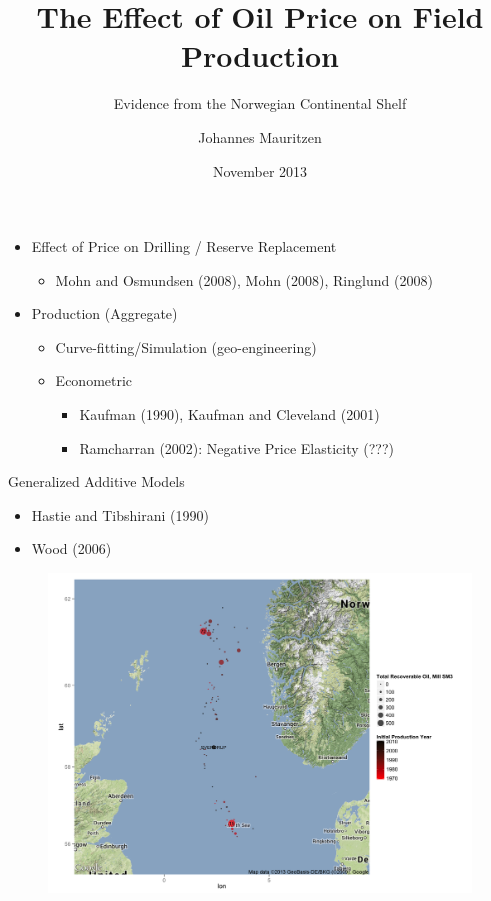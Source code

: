 \documentclass{beamer}
\title[OIL]{The Effect of Oil Price on Field Production}
\subtitle[Errors]{Evidence from the Norwegian Continental Shelf}
\author[J. Mauritzen]{Johannes Mauritzen}
\institute[NHH]{
  \texttt{johannes.mauritzen@nhh.edu}
}
\date[Nov 2013]{November 2013}
\begin{document}
\begin{frame}[plain]
  \titlepage
\end{frame}




\begin{frame}[plain]
	\begin{itemize}

	\item Effect of Price on Drilling / Reserve Replacement
	\begin{itemize} \item Mohn and Osmundsen (2008), Mohn (2008), Ringlund (2008) \end{itemize}
	 \item Production (Aggregate)

		\begin{itemize}
		\item Curve-fitting/Simulation (geo-engineering)
		\item Econometric
			\begin{itemize}
			\item Kaufman (1990), Kaufman and Cleveland (2001)
			\item Ramcharran (2002):  Negative Price Elasticity (???)
	 		\end{itemize}
	 	\end{itemize}
	\end{itemize}
\end{frame}

\begin{frame}[plain]
Generalized Additive Models
\begin{itemize}
\item  Hastie and Tibshirani (1990) 
\item  Wood (2006)
\end {itemize}

\end{frame}

\begin{frame}[plain]
	\begin{figure}
	\includegraphics[width=.8\textwidth]{north_sea_reserves.png}
	\caption{}
	\label{north_sea_reserves}
	\end{figure}
\end{frame}
\end{document}
